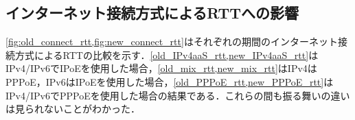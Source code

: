 \subsection{インターネット接続方式によるRTTへの影響}
\cref{fig:old_connect_rtt,fig:new_connect_rtt}はそれぞれの期間のインターネット接続方式によるRTTの比較を示す．\cref{old_IPv4aaS_rtt,new_IPv4aaS_rtt}はIPv4/IPv6でIPoEを使用した場合，\cref{old_mix_rtt,new_mix_rtt}はIPv4はPPPoE，IPv6はIPoEを使用した場合，\cref{old_PPPoE_rtt,new_PPPoE_rtt}はIPv4/IPv6でPPPoEを使用した場合の結果である．これらの間も振る舞いの違いは見られないことがわかった．

